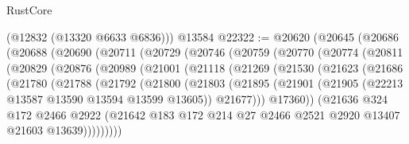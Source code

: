 \begin{lexlean}{RustCore}
\begin{coremodule}
      (@12832 (@13320 @6633 @6836)))
    @13584
@22322 := @20620
    (@20645
      (@20686
        (@20688
          (@20690
            (@20711
              (@20729
                (@20746
                  (@20759
                    (@20770
                      (@20774
                        (@20811
                          (@20829
                            (@20876
                              (@20989
                                (@21001
                                  (@21118
                                    (@21269
                                      (@21530
                                        (@21623
                                          (@21686
                                            (@21780
                                              (@21788
                                                (@21792
                                                  (@21800
                                                    (@21803
                                                      (@21895
                                                        (@21901
                                                          (@21905
                                                            (@22213
                                                              @13587
                                                              @13590
                                                              @13594
                                                              @13599
                                                              @13605))
                                                          @21677)))
                                                    @17360))
                                                (@21636
                                                  @324
                                                  @172
                                                  @2466
                                                  @2922
                                                  (@21642
                                                    @183
                                                    @172
                                                    @214
                                                    @27
                                                    @2466
                                                    @2521
                                                    @2920
                                                    @13407
                                                    @21603
                                                    @13639)))))))))

\end{coremodule}
\end{lexlean}
